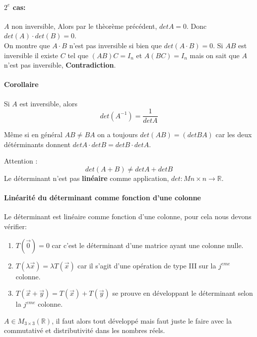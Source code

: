     \paragraph{$2^{e}$ cas: } $A$ non inversible, Alors par le thèorème précédent, $det A = 0$. Donc $det(A) \cdot det(B) = 0$.\\
    On montre que $A\cdot B $ n'est pas inversible si bien que $det(A\cdot B) = 0$. Si $AB$ est inversible il existe $C$ tel que $(AB)C = I_n$ et $A(BC) = I_n$ mais on sait que $A$ n'est pas inversible, \textbf{Contradiction}.
    \\
    \paragraph{Corollaire} Si $A$ est inversible, alors \[det(A^{-1}) = \frac{1}{det A}\]
    \begin{framedremark}
        Même si en général $AB \neq BA$ on a toujours $det(AB) = (detBA)$ car les deux détérminants donnent $det A \cdot det B = det B \cdot det A$.
    \end{framedremark}
    \begin{framedremark}
        
    
        Attention : \[ det(A + B) \neq det A + det B\]
        Le déterminant n'est pas \textbf{linéaire} comme application, $det : M{n\times n} \to \mathbb{R}$.
    
    \end{framedremark}


    \paragraph{Linéarité du déterminant comme fonction \textbf{d'une colonne}}
    Le déterminant est linéaire comme fonction d'une colonne, pour cela nous devons vérifier:
    \begin{enumerate}
        \item $T(\vec{0}) = 0$ car c'est le déterminant d'une matrice ayant une colonne nulle.
        \item $T(\lambda\vec{x}) = \lambda T(\vec{x})$ car il s'agit d'une opération de type III sur la $j^{eme}$ colonne.
        \item $T(\vec{x}+ \vec{y}) = T(\vec{x}) + T(\vec{y})$ se prouve en développant le déterminant selon la $j^{eme}$ colonne.

    \end{enumerate}


    $A  \in M_{3\times3}(\mathbb{R})$, il faut alors tout développé mais faut juste le faire avec la commutativé et distributivité dans les nombres réels.

